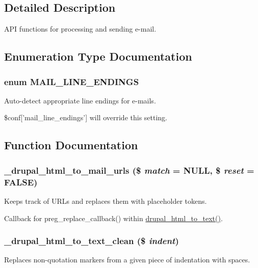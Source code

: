 \subsection{Detailed Description}
API functions for processing and sending e-\/mail. 

\subsection{Enumeration Type Documentation}
\hypertarget{mail_8inc_a135ed72a6f5c8f9693153def270569d9}{
\subsubsection[{MAIL\_\-LINE\_\-ENDINGS}]{\setlength{\rightskip}{0pt plus 5cm}enum {\bf MAIL\_\-LINE\_\-ENDINGS}}}
\label{mail_8inc_a135ed72a6f5c8f9693153def270569d9}
Auto-\/detect appropriate line endings for e-\/mails.

\$conf\mbox{[}'mail\_\-line\_\-endings'\mbox{]} will override this setting. 

\subsection{Function Documentation}
\hypertarget{mail_8inc_af00e85f84e5f0323c0f2f81ed98b6383}{
\subsubsection[{\_\-drupal\_\-html\_\-to\_\-mail\_\-urls}]{\setlength{\rightskip}{0pt plus 5cm}\_\-drupal\_\-html\_\-to\_\-mail\_\-urls (\$ {\em match} = {\ttfamily NULL}, \/  \$ {\em reset} = {\ttfamily FALSE})}}
\label{mail_8inc_af00e85f84e5f0323c0f2f81ed98b6383}
Keeps track of URLs and replaces them with placeholder tokens.

Callback for preg\_\-replace\_\-callback() within \hyperlink{mail_8inc_a1d324056cce089d2fc06dedee5b6e92e}{drupal\_\-html\_\-to\_\-text()}. \hypertarget{mail_8inc_a39b43a9d0ba9add51b67e103c7fbc16e}{
\subsubsection[{\_\-drupal\_\-html\_\-to\_\-text\_\-clean}]{\setlength{\rightskip}{0pt plus 5cm}\_\-drupal\_\-html\_\-to\_\-text\_\-clean (\$ {\em indent})}}
\label{mail_8inc_a39b43a9d0ba9add51b67e103c7fbc16e}
Replaces non-\/quotation markers from a given piece of indentation with spaces.

